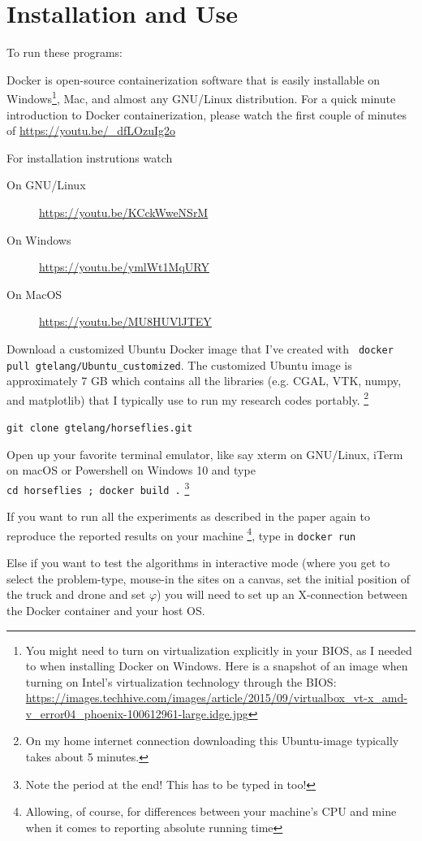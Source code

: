 \documentclass[12pt]{report}
\begin{document}
\chapter{Installation and Use}

To run these programs: 

\begin{alphalist}
\item {} Docker is open-source containerization software that is easily installable on 
  Windows\footnote{You might need to turn on virtualization explicitly in your BIOS, as I needed to when installing Docker on Windows. 
  Here is a snapshot of an image when turning on Intel's virtualization technology through the BIOS: 
\url{https://images.techhive.com/images/article/2015/09/virtualbox_vt-x_amd-v_error04_phoenix-100612961-large.idge.jpg}}, Mac, and almost any 
  GNU/Linux distribution. For a quick minute introduction to Docker containerization, please watch the first couple of minutes of 
  \url{https://youtu.be/_dfLOzuIg2o}
  
  For installation instrutions watch
  \begin{description}
    \item[On GNU/Linux]  \url{https://youtu.be/KCckWweNSrM}
    \item[On Windows]    \url{https://youtu.be/ymlWt1MqURY}
    \item[On MacOS]      \url{https://youtu.be/MU8HUVlJTEY}
  \end{description}

\item {} Download a customized Ubuntu Docker image that 
  I've created with \verb| docker pull gtelang/Ubuntu_customized|. The customized Ubuntu image is approximately
  7 GB which contains all the libraries (e.g. CGAL, VTK, numpy, and matplotlib) that I typically use to run 
  my research codes portably. \footnote{ On my home internet connection downloading this Ubuntu-image typically takes about 5 minutes.}
\item {} \verb|git clone gtelang/horseflies.git|
\item {} Open up your favorite terminal emulator, like say xterm on GNU/Linux, 
  iTerm on macOS or Powershell on Windows 10 and type \\ 
  \verb|cd horseflies ; docker build .| \footnote{ Note the period at the end! This has to be typed in too!}
\item {} If you want to run all the experiments as described in the paper again to reproduce
  the reported results on your machine \footnote{ Allowing, of course,  for differences between 
  your machine's CPU and mine when it comes to reporting absolute running time}, 
  type in \verb|docker run|
\item {}  Else if you want to test the algorithms in interactive mode (where you get to select the problem-type, 
  mouse-in the sites on a canvas, set the initial position of the truck and drone and set $\varphi$) 
  you will need  to set up an X-connection between the Docker container and your host OS.
 

\end{alphalist}
\end{document}
